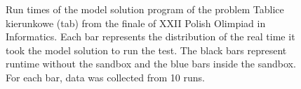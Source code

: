 \documentclass[en]{pracamgr}
\begin{document}
\begin{appendices}
\begin{figure}[H]
\caption{Run times of the model solution program of the problem Tablice kierunkowe (tab) from the finale of XXII Polish Olimpiad in Informatics. Each bar represents the distribution of the real time it took the model solution to run the test. The black bars represent runtime without the sandbox and the blue bars inside the sandbox. For each bar, data was collected from 10 runs.}
\label{figure:tab_model_solution_real_time}
\end{figure}


\end{appendices}
\end{document}
